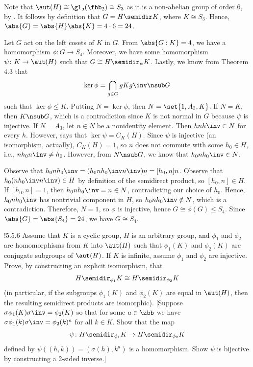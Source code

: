 \begin{solenum}
    \item Note that $\aut(H) \cong \gl_2(\fbb_2) \cong S_3$ as it is a non-abelian group of order 6, by .
	It follows by definition that $G = H \semidir K$, where $K \cong S_3$.
	Hence, $\abs{G} = \abs{H}\abs{K} = 4 \cdot 6 = 24$.
    \item Let $G$ act on the left cosets of $K$ in $G$.
	From $\abs{G : K} = 4$, we have a homomorphism $\phi \colon G \to S_4$.
	Moreover, we have some homomorphism $\psi \colon K \to \aut(H)$ such that $G \cong H \semidir_\psi K$.
	Lastly, we know from Theorem 4.3 that
    \[
    	\ker\phi = \bigcap_{g \in G} gKg\inv \nsub G
    \]
    such that $\ker\phi \leq K$.
	Putting $N = \ker\phi$, then $N = \set{1, A_3, K}$.
	If $N = K$, then $K \nsub G$, which is a contradiction since $K$ is not normal in $G$ because $\psi$ is injective.
	If $N = A_3$, let $n \in N$ be a nonidentity element.
	Then $hnh\inv \in N$ for every $h$.
	However,  says that $\ker\psi = C_K(H)$.
	Since $\psi$ is injective (an isomorphism, actually), $C_K(H) = 1$, so $n$ does not commute with some $h_0 \in H$, i.e., $nh_0n\inv \neq h_0$.
	However, from $N \nsub G$, we know that $h_0nh_0\inv \in N$. 
    
    Observe that $h_0nh_0\inv = (h_0nh_0\inv n\inv)n = [h_0, n]n$.
	Observe that $h_0(nh_0\inv n\inv) \in H$ by definition of the semidirect product, so $[h_0, n] \in H$.
	If $[h_0, n] = 1$, then $h_0nh_0\inv = n \in N$, contradicting our choice of $h_0$.
	Hence, $h_0nh_0\inv$ has nontrivial component in $H$, so $h_0nh_0\inv \notin N$, which is a contradiction.
	Therefore, $N = 1$, so $\phi$ is injective, hence $G \cong \phi(G) \leq S_4$.
	Since $\abs{G} = \abs{S_4} = 24$, we have $G \cong S_4$.
\end{solenum}

\begin{exercise}!{5.5.6}
    Assume that $K$ is a cyclic group, $H$ is an arbitrary group, and $\phi_1$ and $\phi_2$ are homomorphisms from $K$ into $\aut(H)$ such that $\phi_1(K)$ and $\phi_2(K)$ are conjugate subgroups of $\aut(H)$.
	If $K$ is infinite, assume $\phi_1$ and $\phi_2$ are injective.
	Prove, by constructing an explicit isomorphism, that
    \[
    	H \semidir_{\phi_1} K \cong H \semidir_{\phi_2} K
    \]
    (in particular, if the subgroups $\phi_1(K)$ and $\phi_2(K)$ are equal in $\aut(H)$, then the resulting semidirect products are isomorphic). [Suppose $\sigma\phi_1(K)\sigma\inv = \phi_2(K)$ so that for some $a \in \zbb$ we have $\sigma\phi_1(k)\sigma\inv = \phi_2(k)^a$ for all $k \in K$.
	Show that the map
    \[
    	\psi \colon H \semidir_{\phi_1} K \to H \semidir_{\phi_2} K
    \]
    defined by $\psi((h,k)) = (\sigma(h), k^a)$ is a homomorphism.
	Show $\psi$ is bijective by constructing a 2-sided inverse.]
\end{exercise}

